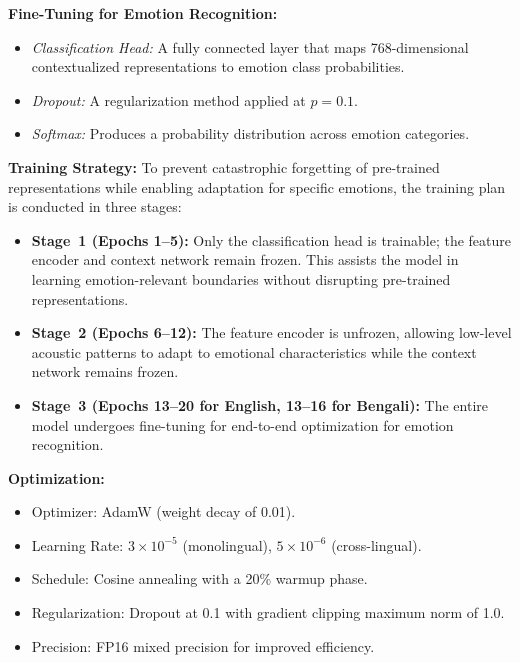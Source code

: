 \documentclass[conference]{IEEEtran}
\begin{document}
\noindent\textbf{Fine-Tuning for Emotion Recognition:}
\begin{itemize}
  \item \textit{Classification Head:} A fully connected layer that maps 768-dimensional
        contextualized representations to emotion class probabilities.
  \item \textit{Dropout:} A regularization method applied at $p=0.1$.
  \item \textit{Softmax:} Produces a probability distribution across emotion categories.
\end{itemize}

\noindent\textbf{Training Strategy:}
To prevent catastrophic forgetting of pre-trained representations while enabling adaptation
for specific emotions, the training plan is conducted in three stages:
\begin{itemize}
  \item \textbf{Stage~1 (Epochs 1--5):} Only the classification head is trainable; the feature
        encoder and context network remain frozen. This assists the model in learning
        emotion-relevant boundaries without disrupting pre-trained representations.
  \item \textbf{Stage~2 (Epochs 6--12):} The feature encoder is unfrozen, allowing low-level
        acoustic patterns to adapt to emotional characteristics while the context network
        remains frozen.
  \item \textbf{Stage~3 (Epochs 13--20 for English, 13--16 for Bengali):} The entire model
        undergoes fine-tuning for end-to-end optimization for emotion recognition.
\end{itemize}

\noindent\textbf{Optimization:}
\begin{itemize}
  \item Optimizer: AdamW (weight decay of 0.01).
  \item Learning Rate: $3{\times}10^{-5}$ (monolingual),\; $5{\times}10^{-6}$ (cross-lingual).
  \item Schedule: Cosine annealing with a 20\% warmup phase.
  \item Regularization: Dropout at 0.1 with gradient clipping maximum norm of 1.0.
  \item Precision: FP16 mixed precision for improved efficiency.
\end{itemize}

\end{document}
